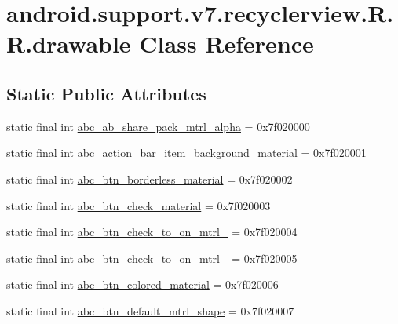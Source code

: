 \hypertarget{classandroid_1_1support_1_1v7_1_1recyclerview_1_1_r_1_1drawable}{
\section{android.support.v7.recyclerview.R.R.drawable Class Reference}
\label{classandroid_1_1support_1_1v7_1_1recyclerview_1_1_r_1_1drawable}
}
\subsection*{Static Public Attributes}
\begin{CompactItemize}
\item 
static final int \hyperlink{classandroid_1_1support_1_1v7_1_1recyclerview_1_1_r_1_1drawable_29d8db1b43a7d706c569db596d74a666}{abc\_\-ab\_\-share\_\-pack\_\-mtrl\_\-alpha} = 0x7f020000
\item 
static final int \hyperlink{classandroid_1_1support_1_1v7_1_1recyclerview_1_1_r_1_1drawable_7f52d624946361493b31d4b3ffcefa6a}{abc\_\-action\_\-bar\_\-item\_\-background\_\-material} = 0x7f020001
\item 
static final int \hyperlink{classandroid_1_1support_1_1v7_1_1recyclerview_1_1_r_1_1drawable_4e3d0f141e1c7877673b897ab4276b5e}{abc\_\-btn\_\-borderless\_\-material} = 0x7f020002
\item 
static final int \hyperlink{classandroid_1_1support_1_1v7_1_1recyclerview_1_1_r_1_1drawable_704543640418a0220aba67654dd31d6e}{abc\_\-btn\_\-check\_\-material} = 0x7f020003
\item 
static final int \hyperlink{classandroid_1_1support_1_1v7_1_1recyclerview_1_1_r_1_1drawable_9e1a5eb187790fea6cfe1978ae7f19f8}{abc\_\-btn\_\-check\_\-to\_\-on\_\-mtrl\_} = 0x7f020004
\item 
static final int \hyperlink{classandroid_1_1support_1_1v7_1_1recyclerview_1_1_r_1_1drawable_1656f3ce8757bb1d6405d6701a8a96df}{abc\_\-btn\_\-check\_\-to\_\-on\_\-mtrl\_} = 0x7f020005
\item 
static final int \hyperlink{classandroid_1_1support_1_1v7_1_1recyclerview_1_1_r_1_1drawable_606ec7e75ad9478d043ad10bead3c346}{abc\_\-btn\_\-colored\_\-material} = 0x7f020006
\item 
static final int \hyperlink{classandroid_1_1support_1_1v7_1_1recyclerview_1_1_r_1_1drawable_77c0805155df7e1e6159091583720a8f}{abc\_\-btn\_\-default\_\-mtrl\_\-shape} = 0x7f020007
\item 

\end{CompactItemize}
